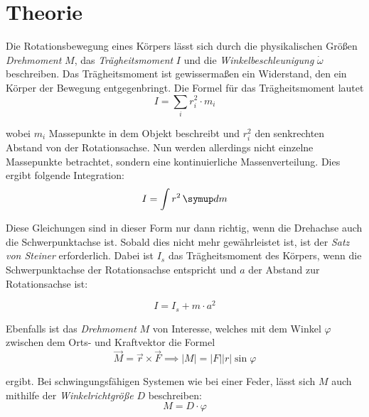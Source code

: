 \section{Theorie \tiny{\cite{v101}}}
\label{sec:Theorie}
\setlength{\parindent}{0pt}

Die Rotationsbewegung eines Körpers lässt sich durch die physikalischen Größen \textit{Drehmoment} $M$, das 
\textit{Trägheitsmoment} $I$ und die \textit{Winkelbeschleunigung} $\dot{\omega}$ beschreiben.
Das Trägheitsmoment ist gewissermaßen ein Widerstand, den ein Körper der Bewegung entgegenbringt.
Die Formel für das Trägheitsmoment lautet
\begin{equation*}
    I = \sum_{i} r_{i}^2 \cdot m_{i} 
\end{equation*}

wobei $m_{i}$ Massepunkte in dem Objekt beschreibt und $r_{i}^2$ den senkrechten Abstand von der Rotationsachse.
Nun werden allerdings nicht einzelne Massepunkte betrachtet, sondern eine kontinuierliche Massenverteilung.
Dies ergibt folgende Integration:
\begin{equation}
    I = \int r^2 \dif{m}
\end{equation}

Diese Gleichungen sind in dieser Form nur dann richtig, wenn die Drehachse auch die Schwerpunktachse ist.
Sobald dies nicht mehr gewährleistet ist, ist der \textit{Satz von Steiner} erforderlich.
Dabei ist $I_{s}$ das Trägheitsmoment des Körpers, wenn die Schwerpunktachse der Rotationsachse entspricht
und $a$ der Abstand zur Rotationsachse ist:

\begin{equation} \label{eq:SatzvSteiner}
    I = I_{s} + m \cdot a^2
\end{equation}

Ebenfalls ist das \textit{Drehmoment} $M$ von Interesse, welches mit dem Winkel $\varphi$ zwischen dem Orts- und Kraftvektor die Formel
\begin{equation} \label{eq:drehmoment}
    \vec{M} = \vec{r} \times \vec{F} \implies \lvert M \rvert = \lvert F \rvert \lvert r \rvert \sin{\varphi}
\end{equation}

ergibt. Bei schwingungsfähigen Systemen wie bei einer Feder, lässt sich $M$ auch mithilfe der \textit{Winkelrichtgröße} $D$ beschreiben:
\begin{equation} \label{eq:drehmomentwinkel}
    M = D \cdot \varphi
\end{equation}

